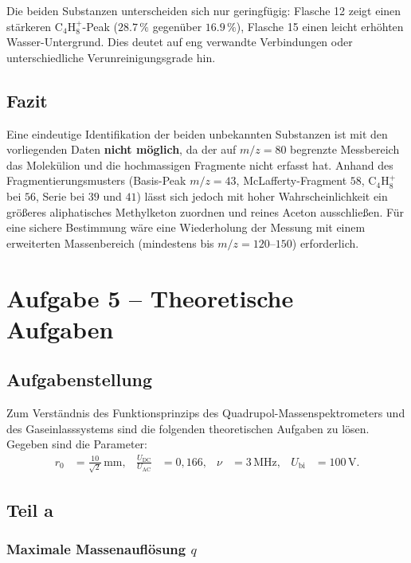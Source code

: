 \documentclass{article}
\begin{document}
Die beiden Substanzen unterscheiden sich nur geringfügig: Flasche 12
zeigt einen stärkeren C$_4$H$_8^+$-Peak ($28.7\,\%$ gegenüber
$16.9\,\%$), Flasche 15 einen leicht erhöhten Wasser-Untergrund. Dies
deutet auf eng verwandte Verbindungen oder unterschiedliche
Verunreinigungsgrade hin.

\subsection*{Fazit}

Eine eindeutige Identifikation der beiden unbekannten Substanzen ist mit
den vorliegenden Daten \textbf{nicht möglich}, da der auf $m/z = 80$
begrenzte Messbereich das Molekülion und die hochmassigen Fragmente
nicht erfasst hat. Anhand des Fragmentierungsmusters (Basis-Peak
$m/z = 43$, McLafferty-Fragment $58$, C$_4$H$_8^+$ bei $56$, Serie bei
$39$ und $41$) lässt sich jedoch mit hoher Wahrscheinlichkeit ein
größeres aliphatisches Methylketon zuordnen und reines Aceton
ausschließen. Für eine sichere Bestimmung wäre eine Wiederholung der
Messung mit einem erweiterten Massenbereich (mindestens bis
$m/z = 120$--$150$) erforderlich.





\section{Aufgabe 5 -- Theoretische Aufgaben}

\subsection*{Aufgabenstellung}

Zum Verständnis des Funktionsprinzips des Quadrupol-Massenspektrometers
und des Gaseinlasssystems sind die folgenden theoretischen Aufgaben zu
lösen. Gegeben sind die Parameter:
\begin{align*}
    r_0 &= \frac{10}{\sqrt{2}}\,\mathrm{mm}, &
    \frac{U_{\mathrm{DC}}}{U_{\mathrm{AC}}} &= 0{,}166, &
    \nu &= 3\,\mathrm{MHz}, &
    U_{\mathrm{bi}} &= 100\,\mathrm{V}.
\end{align*}

\subsection{Teil a}

\subsubsection*{Maximale Massenauflösung $q$}
\end{document}
